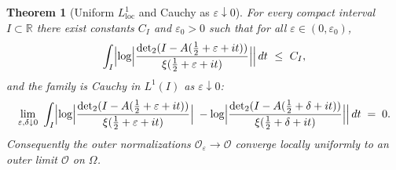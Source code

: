 \documentclass[11pt]{article}
\newtheorem{theorem}{Theorem}
\theoremstyle{definition}
\theoremstyle{remark}
\newcommand{\R}{\mathbb{R}}
\DeclareMathOperator{\dettwo}{det_2}
\begin{document}
\begin{theorem}[Uniform $L^1_{\mathrm{loc}}$ and Cauchy as \(\varepsilon\downarrow 0\)]\label{thm:uniform-eps}
For every compact interval $I\subset\R$ there exist constants $C_I$ and \(\varepsilon_0>0\) such that for all \(\varepsilon\in(0,\varepsilon_0)\),
\[
 \int_I \Bigl|\log\Bigl|\frac{\dettwo(I-A(\tfrac12+\varepsilon+it))}{\xi(\tfrac12+\varepsilon+it)}\Bigr|\Bigr|\,dt\ \le\ C_I,
\]
and the family is Cauchy in $L^1(I)$ as \(\varepsilon\downarrow 0\):
\[
 \lim_{\substack{\varepsilon,\delta\downarrow 0}}\ \int_I \Bigl|\log\Bigl|\frac{\dettwo(I-A(\tfrac12+\varepsilon+it))}{\xi(\tfrac12+\varepsilon+it)}\Bigr|\;-
 \log\Bigl|\frac{\dettwo(I-A(\tfrac12+\delta+it))}{\xi(\tfrac12+\delta+it)}\Bigr|\Bigr|\,dt\;=\;0.
\]
Consequently the outer normalizations \(\mathcal O_{\varepsilon}\to \mathcal O\) converge locally uniformly to an outer limit \(\mathcal O\) on \(\Omega\).
\end{theorem}
\end{document}
